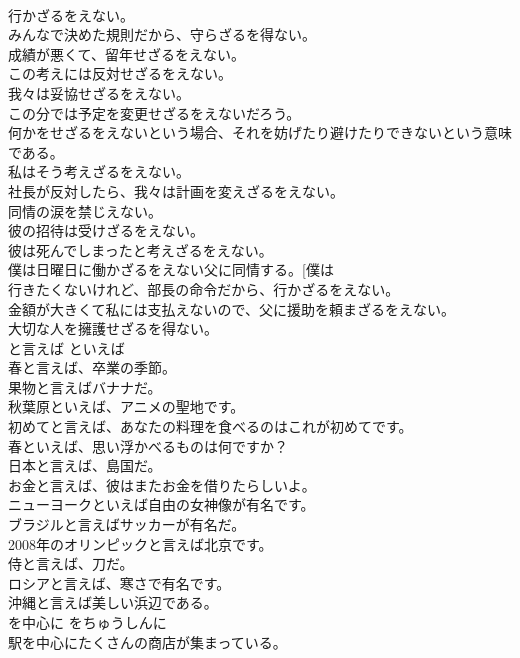 \documentclass[8pt]{extreport}
\begin{document}
\begin{CJK}{UTF8}{min}
\\	行かざるをえない。  
\\	みんなで決めた規則だから、守らざるを得ない。  
\\	成績が悪くて、留年せざるをえない。  
\\	この考えには反対せざるをえない。  
\\	我々は妥協せざるをえない。  
\\	この分では予定を変更せざるをえないだろう。  
\\	何かをせざるをえないという場合、それを妨げたり避けたりできないという意味である。  
\\	私はそう考えざるをえない。  
\\	社長が反対したら、我々は計画を変えざるをえない。  
\\	同情の涙を禁じえない。  
\\	彼の招待は受けざるをえない。  
\\	彼は死んでしまったと考えざるをえない。  
\\	僕は日曜日に働かざるをえない父に同情する。[僕は
\\	行きたくないけれど、部長の命令だから、行かざるをえない。   
\\	金額が大きくて私には支払えないので、父に援助を頼まざるをえない。  
\\	大切な人を擁護せざるを得ない。  
\\	と言えば	といえば	
\\	春と言えば、卒業の季節。  
\\	果物と言えばバナナだ。  
\\	秋葉原といえば、アニメの聖地です。  
\\	初めてと言えば、あなたの料理を食べるのはこれが初めてです。  
\\	春といえば、思い浮かべるものは何ですか？  
\\	日本と言えば、島国だ。  
\\	お金と言えば、彼はまたお金を借りたらしいよ。  
\\	ニューヨークといえば自由の女神像が有名です。  
\\	ブラジルと言えばサッカーが有名だ。   
\\	2008年のオリンピックと言えば北京です。  
\\	侍と言えば、刀だ。  
\\	ロシアと言えば、寒さで有名です。  
\\	沖縄と言えば美しい浜辺である。  
\\	を中心に	をちゅうしんに	
\\	駅を中心にたくさんの商店が集まっている。  

\end{CJK}
\end{document}
